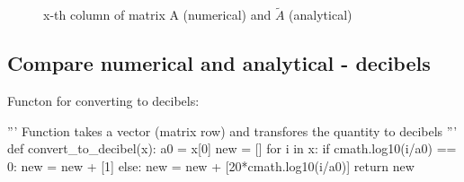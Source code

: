\documentclass[a4paper, 16pt]{article}
\begin{document}
\begin{figure}[H]
\caption{x-th column of matrix A (numerical) and $\tilde{A}$ (analytical)}
\label{some example}
\end{figure}



\newpage

\subsection{Compare numerical and analytical - decibels}

Functon for converting to decibels:
\begin{python}
''' Function takes a vector (matrix row) and transfores the quantity to decibels '''
def convert_to_decibel(x):
    a0 = x[0]
    new = []
    for i in x:
        if cmath.log10(i/a0) == 0:
            new = new + [1]
        else:
            new = new +  [20*cmath.log10(i/a0)]
    return new
\end{python}
\end{document}
